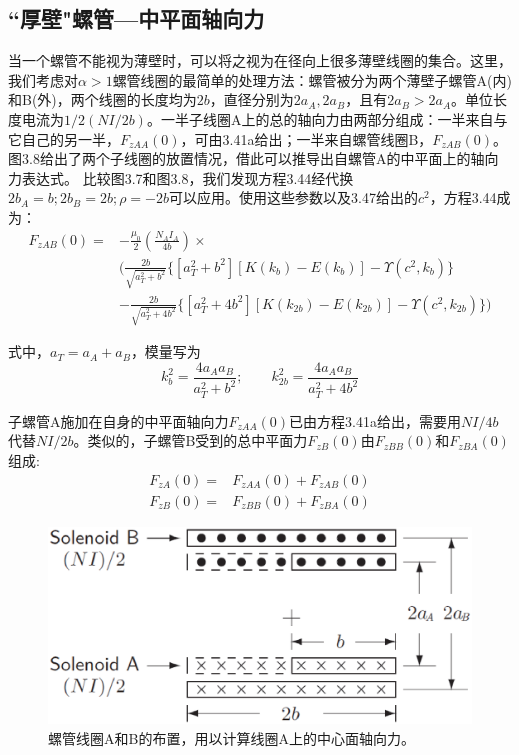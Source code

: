 \subsection{``厚壁"螺管---中平面轴向力}
当一个螺管不能视为薄壁时，可以将之视为在径向上很多薄壁线圈的集合。这里，我们考虑对$\alpha>1$螺管线圈的最简单的处理方法：螺管被分为两个薄壁子螺管A(内)和B(外)，两个线圈的长度均为$2b$，直径分别为$2a_A,2a_B$，且有$2a_B >2a_A$。单位长度电流为$1/2(NI/2b)$。一半子线圈A上的总的轴向力由两部分组成：一半来自与它自己的另一半，$F_{zAA}(0)$，可由3.41a给出；一半来自螺管线圈B，$F_{zAB}(0)$。图3.8给出了两个子线圈的放置情况，借此可以推导出自螺管A的中平面上的轴向力表达式。
比较图3.7和图3.8，我们发现方程3.44经代换$2b_A = b; 2b_B = 2b; \rho = −2b$可以应用。使用这些参数以及3.47给出的$c^2$，方程3.44成为：
\begin{equation}
\begin{split}
F_{zAB}(0)=&-\frac{\mu_0}{2}(\frac{N_A I_A}{4b})\times \\
&\bigg(\frac{2b}{\sqrt{a_T^2+b^2}} \{[a_T^2+b^2][K(k_{b})-E(k_{b})]-\Upsilon(c^2,k_b)\}\\
&-\frac{2b}{\sqrt{a_T^2+4b^2}} \{[a_T^2+4b^2][K(k_{2b})-E(k_{2b})]-\Upsilon(c^2,k_{2b}) \}\bigg)
\end{split}
\end{equation}

式中，$a_T=a_A+a_B$，模量写为
$$k_{b}^2=\frac{4a_A a_B}{a_T^2+b^2} ;\qquad k_{2b}^2=\frac{4a_A a_B}{a_T^2+4b^2} $$

子螺管A施加在自身的中平面轴向力$F_{zAA}(0)$已由方程3.41a给出，需要用$NI/4b$代替$NI/2b$。类似的，子螺管B受到的总中平面力$F_{zB}(0)$由$F_{zBB}(0)$和$F_{zBA}(0)$组成:
\begin{subequations}
	\begin{align}
F_{zA}(0) =& F_{zAA}(0)+F_{zAB}(0) \\
F_{zB}(0) =& F_{zBB}(0)+F_{zBA}(0)
	\end{align}
\end{subequations}

\begin{figure}[htbp]
  \centering
 \includegraphics[scale=0.4]{chpt3/figs/fig3.8.eps}
  \caption{螺管线圈A和B的布置，用以计算线圈A上的中心面轴向力。}
\end{figure}

